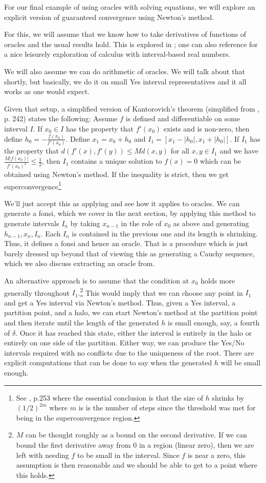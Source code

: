 \documentclass[12pt]{article}
\begin{document}
For our final example of using oracles with solving equations, we will explore an explicit version of guaranteed convergence using Newton's method. 

For this, we will assume that we know how to take derivatives of functions of oracles and the usual results hold. This is explored in \cite{taylor23funora}; one can also reference \cite{bridger} for a nice leisurely exploration of calculus with interval-based real numbers. 

We will also assume we can do arithmetic of oracles. We will talk about that shortly, but basically, we do it on small Yes interval representatives and it all works as one would expect. 

Given that setup, a simplified version of Kantorovich's theorem (simplified from \cite{hubbard}, p. 242) states the following:
Assume $f$ is defined and differentiable on some interval $I$.  If $x_0\in I$ has the property that $f'(x_0)$ exists and is non-zero, then define $h_0 = -\frac{f(x_0)}{f'(x_0)}$. Define $x_1 = x_0 + h_0$ and $I_1 = [x_1-|h_0|, x_1 + |h_0|]$. If $I_1$ has the property that $d(f'(x), f'(y)) \leq M d(x, y)$ for all $x, y \in I_1$ and we have $\frac{M|f(x_0)|}{f'(x_0)^2} \leq \frac{1}{2}$, then $I_1$ contains a unique solution to $f(x) = 0$ which can be obtained using Newton's method. If the inequality is strict, then we get superconvergence\footnote{See \cite{hubbard}, p.253 where the essential conclusion is that the size of $h$ shrinks by $(1/2)^{2m}$ where $m$ is is the number of steps since the threshold was met for being in the superconvergence region.} 

We'll just accept this as applying and see how it applies to oracles. We can generate a fonsi, which we cover in the next section, by applying this method to generate intervals $I_n$ by taking $x_{n-1}$ in the role of $x_0$ as above and generating $h_{n-1}, x_n, I_n$. Each $I_n$ is contained in the previous one and its length is shrinking. Thus, it defines a fonsi and hence an oracle. That is a procedure which is just barely dressed up beyond that of viewing this as generating a Cauchy sequence, which we also discuss extracting an oracle from. 

An alternative approach is to assume that the condition at $x_0$ holds more generally throughout $I_1$.\footnote{$M$ can be thought roughly as a bound on the second derivative. If we can bound the first derivative away from 0 in a region (linear zero), then we are left with needing $f$ to be small in the interval. Since $f$ is near a zero, this assumption is then reasonable and we should be able to get to a point where this holds.} This would imply that we can choose any point in $I_1$ and get a Yes interval via Newton's method. Thus, given a Yes interval, a partition point, and a halo, we can start Newton's method at the partition point and then iterate until the length of the generated $h$ is small enough, say, a fourth of $\delta$. Once it has reached this state, either the interval is entirely in the halo or entirely on one side of the partition. Either way, we can produce the Yes/No intervals required with no conflicts due to the uniqueness of the root. There are explicit computations that can be done to say when the generated $h$ will be small enough. 
\end{document}
